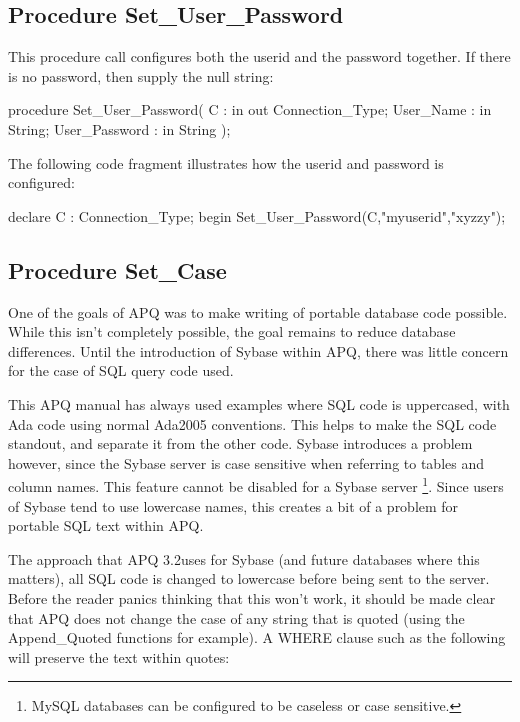 \documentclass[english,letterpaper]{book}
\newcommand\apqversion{3.2}
\begin{document}
\subsection{Procedure Set\_User\_Password}

This procedure call configures both the userid and the password together.
If there is no password, then supply the null string:

\begin{Code}
procedure Set_User_Password(
   C :             in out Connection_Type;
   User_Name :     in     String;
   User_Password : in     String
);
\end{Code}

The following code fragment illustrates how the userid and
password is configured:

\begin{Example}
declare
   C :   Connection_Type;
begin
   Set_User_Password(C,"myuserid","xyzzy");
\end{Example}

\subsection{Procedure Set\_Case}

One of the goals of APQ was to make writing of portable database code
possible. While this isn't completely possible, the goal remains to
reduce database differences. Until the introduction of Sybase within
APQ, there was little concern for the case of SQL query code used. 

This APQ manual has always used examples where SQL code is uppercased,
with Ada code using normal Ada2005 conventions. This helps to make the
SQL code standout, and separate it from the other code. Sybase introduces
a problem however, since the Sybase server is case sensitive when
referring to tables and column names. This feature cannot be disabled
for a Sybase server%
\footnote{MySQL databases can be configured to be caseless or case sensitive.%
}. Since users of Sybase tend to use lowercase names, this creates
a bit of a problem for portable SQL text within APQ.

The approach that APQ \apqversion uses for Sybase (and future databases where
this matters), all SQL code is changed to lowercase before being
sent to the server. Before the reader panics thinking that this won't
work, it should be made clear that APQ does not change the case of
any string that is quoted (using the Append\_Quoted functions for
example). A WHERE clause such as the following will preserve the text
within quotes:
\end{document}
